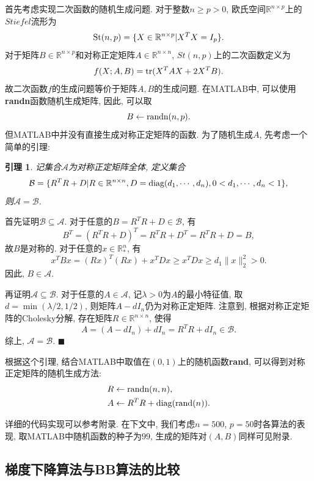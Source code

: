 \documentclass[UTF8]{ctexart}
\newtheorem{lemma}[theorem]{引理}
\newenvironment{proof}{{\textit{证明}:\quad }}{\hfill $\blacksquare$\par}
\begin{document}
首先考虑实现二次函数的随机生成问题. 对于整数$n\geq p>0$, 欧氏空间$\mathbb{R}^{n\times p}$上的$Stiefel$流形为
\[\textup{St}(n,p)=\{X\in\mathbb{R}^{n\times p}|X^T X=I_p\}.\]
对于矩阵$B\in \mathbb{R}^{n\times p}$和对称正定矩阵$A\in\mathbb{R}^{n\times n}$, $St(n,p)$上的二次函数定义为
\[f(X;A,B)=\textup{tr}(X^T AX+2X^T B).\]
故二次函数$f$的生成问题等价于矩阵$A,B$的生成问题. 在MATLAB中, 可以使用\textbf{randn}函数随机生成矩阵, 因此, 可以取
\[B\leftarrow \textup{randn}(n,p).\]
但MATLAB中并没有直接生成对称正定矩阵的函数. 为了随机生成$A$, 先考虑一个简单的引理: 
\begin{lemma}
    记集合$\mathcal{A}$为对称正定矩阵全体, 定义集合
    \[\mathcal{B}=\{R^T R+D|R\in\mathbb{R}^{n\times n}, D=\textup{diag}(d_1,\cdots,d_n), 0<d_1,\cdots,d_n<1\},\]
    则$\mathcal{A}=\mathcal{B}$. 
\end{lemma}
\begin{proof}
    首先证明$\mathcal{B}\subseteq\mathcal{A}$. 对于任意的$B=R^T R+D\in\mathcal{B}$, 有
    \[B^T=(R^T R+D)^T=R^T R+D^T=R^T R+D=B,\]
    故$B$是对称的. 对于任意的$x\in\mathbb{R}^n_*$, 有
    \[x^T Bx=(Rx)^T(Rx)+x^T Dx\geq x^T Dx\geq d_1 \lVert x\rVert_2^2>0.\]
    因此, $B\in\mathcal{A}$.\par
    再证明$\mathcal{A}\subseteq\mathcal{B}$. 对于任意的$A\in\mathcal{A}$, 记$\lambda>0$为$A$的最小特征值, 取$d=\min(\lambda/2,1/2)$, 则矩阵$A-dI_n$仍为对称正定矩阵. 注意到, 根据对称正定矩阵的Cholesky分解, 存在矩阵$R\in\mathbb{R}^{n\times n}$, 使得
    \[A=(A-dI_n)+dI_n=R^T R+dI_n\in\mathcal{B}.\]
    综上, $\mathcal{A}=\mathcal{B}$. 
\end{proof}\par
根据这个引理, 结合MATLAB中取值在$(0,1)$上的随机函数\textbf{rand}, 可以得到对称正定矩阵的随机生成方法:
\begin{align*}
    R&\leftarrow \textup{randn}(n,n),\\
    A&\leftarrow R^T R+\textup{diag}(\textup{rand}(n)). 
\end{align*}\par
详细的代码实现可以参考附录. 在下文中, 我们考虑$n=500$, $p=50$时各算法的表现, 取MATLAB中随机函数的种子为$99$, 生成的矩阵对$(A,B)$同样可见附录.

\subsection{梯度下降算法与BB算法的比较}
\end{document}
